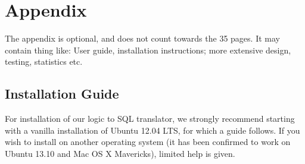 \documentclass[a4paper, 11pt]{article}
\begin{document}
\appendix
\section{Appendix}
  The appendix is optional, and does not count towards the 35 pages. It may
  contain thing like: User guide, installation instructions; more extensive
  design, testing, statistics etc.

  \subsection{Installation Guide}
    For installation of our logic to SQL translator, we strongly recommend
    starting with a vanilla installation of Ubuntu 12.04 LTS, for which a guide
    follows. If you wish to install on another operating system (it has been 
    confirmed to work on Ubuntu 13.10 and Mac OS X Mavericks),
    limited help is given.
\end{document}
